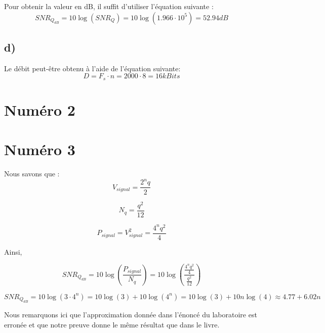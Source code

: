 Pour obtenir la valeur en dB, il suffit d'utiliser l'équation suivante :
\begin{equation}
	SNR_{Q_{dB}} = 10 \log(SNR_Q) = 10 \log(1.966 \cdot 10^5) = 52.94 dB
\end{equation}

\subsection*{d)}
Le débit peut-être obtenu à l'aide de l'équation suivante:
\begin{equation}
	D = F_s \cdot n = 2000 \cdot 8 = 16 kBits
\end{equation}

\section*{Numéro 2}
\section*{Numéro 3}
Nous savons que :
\begin{equation}
	V_{signal} = \frac{2^nq}{2}
\end{equation}

\begin{equation}
	N_q = \frac{q^2}{12}
\end{equation}

\begin{equation}
	P_{signal} = V_{signal}^2 = \frac{4^nq^2}{4}
\end{equation}

Ainsi,

\begin{equation}
	SNR_{Q_{dB}} = 10 \log\left(\frac{P_{signal}}{N_q}\right) = 10 \log\left(\frac{\frac{4^nq^2}{4}}{\frac{q^2}{12}}\right)
\end{equation}

\begin{equation}
	SNR_{Q_{dB}}= 10 \log(3\cdot4^n) = 10\log(3) + 10\log(4^n) = 10\log(3) + 10n\log(4) \approx 4.77 + 6.02n
\end{equation}

Nous remarquons ici que l'approximation donnée dans l'énoncé du laboratoire est erronée et que notre preuve donne le même résultat que dans le livre.


